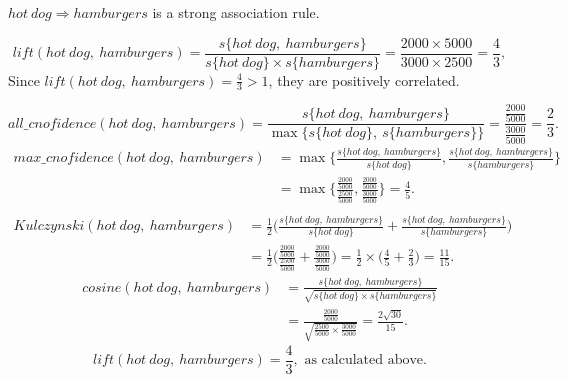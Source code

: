 \documentclass[11pt]{article}%
\begin{document}
\begin{questions}[start=2]
{\begin{questions}
            $hot\ dog\Rightarrow hamburgers$ is a strong association rule.
            \item $$lift(hot\ dog,\ hamburgers)=\frac{s\{hot\ dog,\ hamburgers\}}{s\{hot\ dog\}\times s\{hamburgers\}}=\frac{2000\times 5000}{3000\times 2500}=\frac{4}{3},$$
            Since $lift(hot\ dog,\ hamburgers)=\frac{4}{3}>1$, they are positively correlated.
            \item $$all\_cnofidence(hot\ dog,\ hamburgers)=\frac{s\{hot\ dog,\ hamburgers\}}{\max\{s\{hot\ dog\},\ s\{hamburgers\}\}}=\frac{\frac{2000}{5000}}{\frac{3000}{5000}}=\frac{2}{3}.$$
            \begin{align*}
                max\_cnofidence(hot\ dog,\ hamburgers)
                &=\max\big\{\frac{s\{hot\ dog,\ hamburgers\}}{s\{hot\ dog\}},\frac{s\{hot\ dog,\ hamburgers\}}{s\{hamburgers\}}\big\}\\
                &=\max\big\{\frac{\frac{2000}{5000}}{\frac{2500}{5000}},\frac{\frac{2000}{5000}}{\frac{3000}{5000}}\big\}=\frac{4}{5}.\\
            \end{align*}
            \begin{align*}
                Kulczynski(hot\ dog,\ hamburgers)
                &=\frac{1}{2}\Big(\frac{s\{hot\ dog,\ hamburgers\}}{s\{hot\ dog\}}+\frac{s\{hot\ dog,\ hamburgers\}}{s\{hamburgers\}}\Big)\\
                &=\frac{1}{2}\Big(\frac{\frac{2000}{5000}}{\frac{2500}{5000}}+\frac{\frac{2000}{5000}}{\frac{3000}{5000}}\Big)
                =\frac{1}{2}\times \Big(\frac{4}{5}+\frac{2}{3}\Big)
                =\frac{11}{15}.
            \end{align*}
            \begin{align*}
                cosine(hot\ dog,\ hamburgers)
                &=\frac{s\{hot\ dog,\ hamburgers\}}{\sqrt{s\{hot\ dog\}\times s\{hamburgers\}}}\\
                &=\frac{\frac{2000}{5000}}{\sqrt{\frac{2500}{5000}\times \frac{3000}{5000}}}
                =\frac{2\sqrt{30}}{15}.
            \end{align*}
            $$lift(hot\ dog,\ hamburgers)=\frac{4}{3},\text{ as calculated above.}$$ 
        \end{questions}
    }
\end{questions}
\pagebreak
\end{document}

